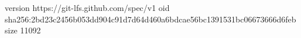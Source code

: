 version https://git-lfs.github.com/spec/v1
oid sha256:2bd23c2456b053dd904c91d7d64d460a6bdcae56bc1391531bc06673666d6feb
size 11092
